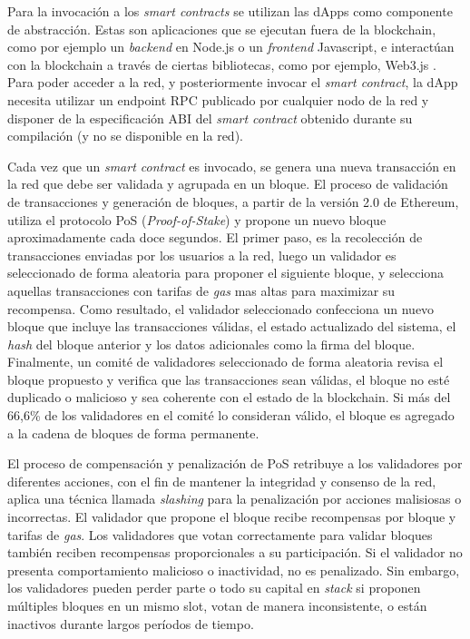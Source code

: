 Para la invocación a los \textit{smart contracts} se utilizan las dApps como componente de abstracción. Estas son aplicaciones que se ejecutan fuera de la blockchain, como por ejemplo un \textit{backend} en Node.js o un \textit{frontend} Javascript, e interactúan con la blockchain a través de ciertas bibliotecas, como por ejemplo, Web3.js \citep{web3}. Para poder acceder a la red, y posteriormente invocar el \textit{smart contract}, la dApp necesita utilizar un endpoint RPC publicado por cualquier nodo de la red y disponer de la especificación ABI del \textit{smart contract} obtenido durante su compilación (y no se disponible en la red).

Cada vez que un \textit{smart contract} es invocado, se genera una nueva transacción en la red que debe ser validada y agrupada en un bloque. El proceso de validación de transacciones y generación de bloques, a partir de la versión 2.0 de Ethereum, utiliza el protocolo PoS (\textit{Proof-of-Stake}) \citep{PoS} y propone un nuevo bloque aproximadamente cada doce segundos. El primer paso, es la recolección de transacciones enviadas por los usuarios a la red, luego un validador es seleccionado de forma aleatoria para proponer el siguiente bloque, y selecciona aquellas transacciones con tarifas de \textit{gas} mas altas para maximizar su recompensa. Como resultado, el validador seleccionado confecciona un nuevo bloque que incluye las transacciones válidas, el estado actualizado del sistema, el \textit{hash} del bloque anterior y los datos adicionales como la firma del bloque. Finalmente, un comité de validadores seleccionado de forma aleatoria revisa el bloque propuesto y verifica que las transacciones sean válidas, el bloque no esté duplicado o malicioso y sea coherente con el estado de la blockchain. Si más del 66,6\% de los validadores en el comité lo consideran válido, el bloque es agregado a la cadena de bloques de forma permanente.

El proceso de compensación y penalización de PoS retribuye a los validadores por diferentes acciones, con el fin de mantener la integridad y consenso de la red, aplica una técnica llamada \textit{slashing} para la penalización por acciones malisiosas o incorrectas. El validador que propone el bloque recibe recompensas por bloque y tarifas de \textit{gas}. Los validadores que votan correctamente para validar bloques también reciben recompensas proporcionales a su participación. Si el validador no presenta comportamiento malicioso o inactividad, no es penalizado. Sin embargo, los validadores pueden perder parte o todo su capital en \textit{stack} si proponen múltiples bloques en un mismo slot, votan de manera inconsistente, o están inactivos durante largos períodos de tiempo.

